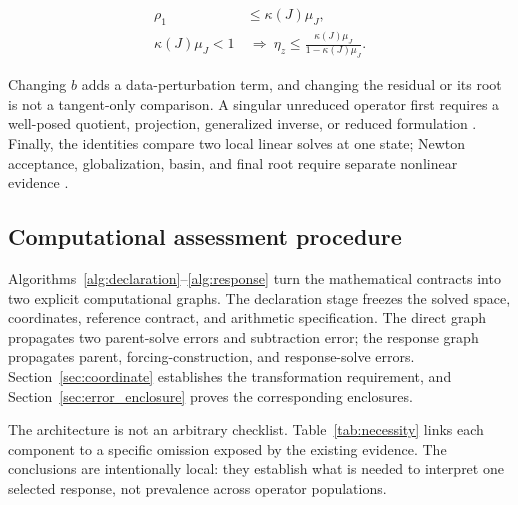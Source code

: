 \documentclass[preprint,12pt]{elsarticle}
\theoremstyle{definition}
\begin{document}
\begin{linenomath*}
\begin{equation}
\begin{aligned}
\rho_1 &\leq \kappa(J)\mu_J,\\
\kappa(J)\mu_J<1 &\ \Longrightarrow\ 
\eta_z\leq\frac{\kappa(J)\mu_J}{1-\kappa(J)\mu_J}.
\end{aligned}
\label{eq:condition_comparison}
\end{equation}
\end{linenomath*}

Changing $b$ adds a data-perturbation term, and changing the residual or its root is not a tangent-only comparison. A singular unreduced operator first requires a well-posed quotient, projection, generalized inverse, or reduced formulation \cite{S17,S20}. Finally, the identities compare two local linear solves at one state; Newton acceptance, globalization, basin, and final root require separate nonlinear evidence \cite{S21,S23}.

\subsection{Computational assessment procedure}

Algorithms~\ref{alg:declaration}--\ref{alg:response} turn the mathematical contracts into two explicit computational graphs. The declaration stage freezes the solved space, coordinates, reference contract, and arithmetic specification. The direct graph propagates two parent-solve errors and subtraction error; the response graph propagates parent, forcing-construction, and response-solve errors. Section~\ref{sec:coordinate} establishes the transformation requirement, and Section~\ref{sec:error_enclosure} proves the corresponding enclosures.



The architecture is not an arbitrary checklist. Table~\ref{tab:necessity} links each component to a specific omission exposed by the existing evidence. The conclusions are intentionally local: they establish what is needed to interpret one selected response, not prevalence across operator populations.

\begin{table}[htbp]
\centering
\small
\caption{Evidence-backed necessity of the assessment components.}
\label{tab:necessity}

\end{table}
\end{document}

